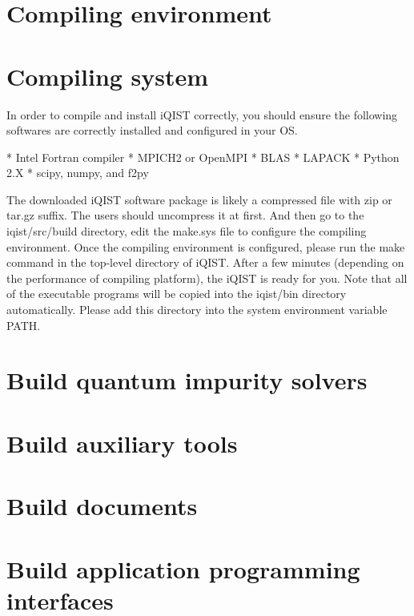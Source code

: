 \section{Compiling environment}

\section{Compiling system}

In order to compile and install iQIST correctly, you should ensure the
following softwares are correctly installed and configured in your OS.

* Intel Fortran compiler
* MPICH2 or OpenMPI
* BLAS
* LAPACK
* Python 2.X
* scipy, numpy, and f2py

The downloaded iQIST software package is likely a compressed file with zip
or tar.gz suffix. The users should uncompress it at first. And then go to
the iqist/src/build directory, edit the make.sys file to configure the
compiling environment. Once the compiling environment is configured,
please run the make command in the top-level directory of iQIST. After a
few minutes (depending on the performance of compiling platform), the
iQIST is ready for you. Note that all of the executable programs will be
copied into the iqist/bin directory automatically. Please add this
directory into the system environment variable PATH.

\section{Build quantum impurity solvers}
\section{Build auxiliary tools}
\section{Build documents}
\section{Build application programming interfaces}
